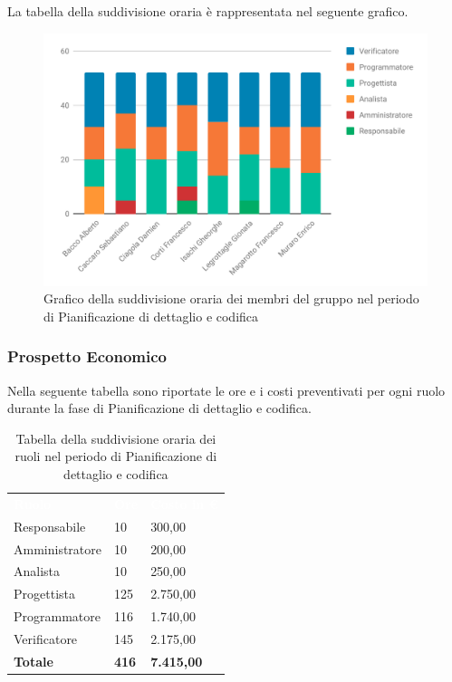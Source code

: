 La tabella della suddivisione oraria è rappresentata nel seguente grafico.
\begin{figure}[H]
\centering
	\includegraphics[width=1\linewidth]{Preventivo/grafici/PC1_1.pdf}
	\caption{Grafico della suddivisione oraria dei membri del gruppo nel periodo di Pianificazione di dettaglio e codifica}
\end{figure}

\subsubsection{Prospetto Economico}
Nella seguente tabella sono riportate le ore e i costi preventivati per ogni ruolo durante la fase di Pianificazione di dettaglio e codifica.


\begin{table}[H]	
	\begin{center}
	    \begin{tabular}{C{4cm}C{1cm}C{3,5cm}}
			\textcolor{white}{\textbf{Ruolo}} & \textcolor{white}{\textbf{Ore}} & \textcolor{white}{\textbf{Costo in €}}
			\\ 
			Responsabile & 10 & 300,00 \\
			Amministratore & 10 & 200,00 \\
			Analista & 10 & 250,00 \\
			Progettista & 125 & 2.750,00 \\
			Programmatore & 116 & 1.740,00 \\
			Verificatore & 145 & 2.175,00 \\
			\textbf{Totale} & \textbf{416} & \textbf{7.415,00} \\
		\end{tabular}
	    \caption{Tabella della suddivisione oraria dei ruoli nel periodo di Pianificazione di dettaglio e codifica} \label{tab:tabellaRuoliPianificazione di dettaglio e codifica} 
	\end{center}
\end{table}


